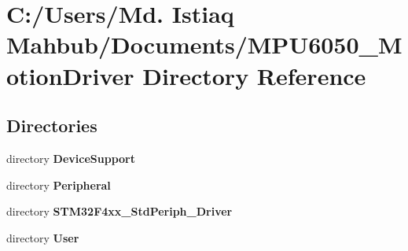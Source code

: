 \section{C\+:/\+Users/\+Md. Istiaq Mahbub/\+Documents/\+M\+P\+U6050\+\_\+\+Motion\+Driver Directory Reference}
\label{dir_f7b58240a626b575db0441590cb4dc5a}
\subsection*{Directories}
\begin{DoxyCompactItemize}
\item 
directory \textbf{ Device\+Support}
\item 
directory \textbf{ Peripheral}
\item 
directory \textbf{ S\+T\+M32\+F4xx\+\_\+\+Std\+Periph\+\_\+\+Driver}
\item 
directory \textbf{ User}
\end{DoxyCompactItemize}
